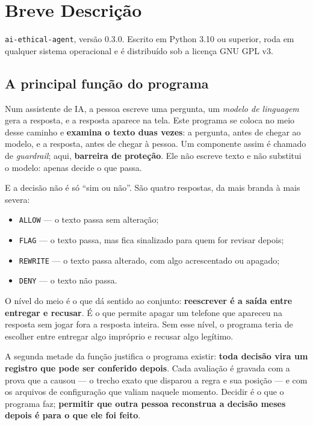 \documentclass[10pt]{article}
\begin{document}
\section{Breve Descrição}

\texttt{ai-ethical-agent}, versão 0.3.0. Escrito em Python 3.10 ou superior, roda em qualquer sistema operacional e é distribuído sob a licença GNU GPL v3.

\subsection{A principal função do programa}

Num assistente de IA, a pessoa escreve uma pergunta, um \emph{modelo de linguagem} gera a resposta, e a resposta aparece na tela. Este programa se coloca no meio desse caminho e \textbf{examina o texto duas vezes}: a pergunta, antes de chegar ao modelo, e a resposta, antes de chegar à pessoa. Um componente assim é chamado de \emph{guardrail}; aqui, \textbf{barreira de proteção}. Ele não escreve texto e não substitui o modelo: apenas decide o que passa.

E a decisão não é só ``sim ou não''. São quatro respostas, da mais branda à mais severa:

\begin{itemize}\itemsep0pt
\item \texttt{ALLOW} --- o texto passa sem alteração;
\item \texttt{FLAG} --- o texto passa, mas fica sinalizado para quem for revisar depois;
\item \texttt{REWRITE} --- o texto passa alterado, com algo acrescentado ou apagado;
\item \texttt{DENY} --- o texto não passa.
\end{itemize}

O nível do meio é o que dá sentido ao conjunto: \textbf{reescrever é a saída entre entregar e recusar}. É o que permite apagar um telefone que apareceu na resposta sem jogar fora a resposta inteira. Sem esse nível, o programa teria de escolher entre entregar algo impróprio e recusar algo legítimo.

A segunda metade da função justifica o programa existir: \textbf{toda decisão vira um registro que pode ser conferido depois}. Cada avaliação é gravada com a prova que a causou --- o trecho exato que disparou a regra e sua posição --- e com os arquivos de configuração que valiam naquele momento. Decidir é o que o programa faz; \textbf{permitir que outra pessoa reconstrua a decisão meses depois é para o que ele foi feito}.
\end{document}

